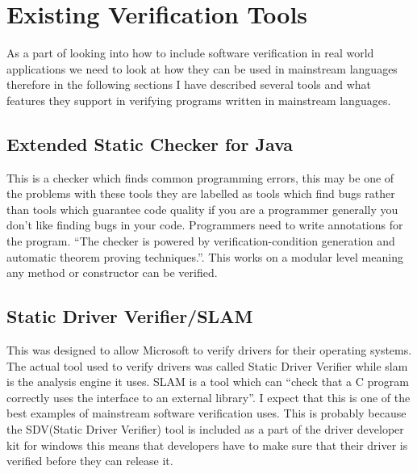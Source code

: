 \documentclass[a4paper,12pt]{scrartcl}
\begin{document}
	\section{Existing Verification Tools}
	{
		As a part of looking into how to include software verification in real world applications we need to look at how they can be used in mainstream languages therefore in the following sections I have described several tools and what features they support in verifying programs written in mainstream languages.
		\subsection{Extended Static Checker for Java\cite{Flanagan2002}}
		{
			This is a checker which finds common programming errors, this may be one of the problems with these tools they are labelled as tools which find bugs rather than tools which guarantee code quality if you are a programmer generally you don't like finding bugs in your code. Programmers need to write annotations for the program. \enquote{The checker is powered by verification-condition generation and automatic theorem proving techniques.}\cite{Flanagan2002}. This works on a modular level meaning any method or constructor can be verified.
		}
		\subsection{Static Driver Verifier/SLAM\cite{Ball2004}}
		{
			This was designed to allow Microsoft to verify drivers for their operating systems. The actual tool used to verify drivers was called Static Driver Verifier while slam is the analysis engine it uses. SLAM is a tool which can \enquote{check that a C program correctly uses the interface to an external library}\cite{Ball2004}. I expect that this is one of the best examples of mainstream software verification uses. This is probably because the SDV(Static Driver Verifier) tool is included as a part of the driver developer kit for windows this means that developers have to make sure that their driver is verified before they can release it.
		}
}
\end{document}
